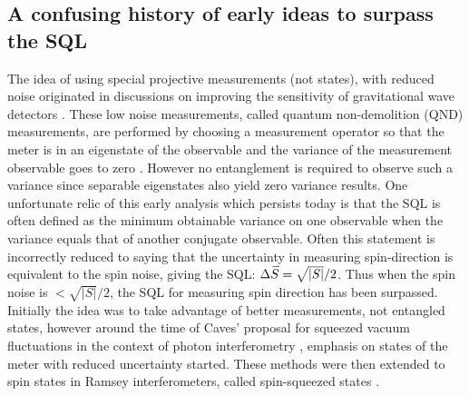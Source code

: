 \documentclass[reqno]{amsart}
\newcommand{\myvec}[1]{\accentset{\rightharpoonup}{#1}}
\begin{document}

\subsection{A confusing history of early ideas to surpass the SQL}\label{App:History}
The idea of using special projective measurements (not states), with reduced noise originated in discussions on improving the sensitivity of gravitational wave detectors \cite{Braginsky1974, Braginsky1977, Unruh1979, Braginsky1996}. These low noise measurements, called quantum non-demolition (QND) measurements, are performed by choosing a measurement operator so that the meter is in an eigenstate of the observable and the variance of the measurement observable goes to zero \cite{Unruh1978, Braginsky1980}. However no entanglement is required to observe such a variance since separable eigenstates also yield zero variance results. One unfortunate relic of this early analysis which persists today is that the SQL is often defined as the minimum obtainable variance on one observable when the variance equals that of another conjugate observable. Often this statement is incorrectly reduced to saying that the uncertainty in measuring spin-direction is equivalent to the spin noise, giving the SQL: $\Delta \myvec{S} = \sqrt{|S|}/2$. Thus when the spin noise is $< \sqrt{|S|}/2$, the SQL for measuring spin direction has been surpassed. Initially the idea was to take advantage of better measurements, not entangled states, however around the time of Caves' proposal for squeezed vacuum fluctuations in the context of photon interferometry \cite{Caves1981}, emphasis on states of the meter with reduced uncertainty started. These methods were then extended to spin states in Ramsey interferometers, called spin-squeezed states \cite{Kitagawa1991, Wineland1992, Kitagawa1993}.
\end{document}
